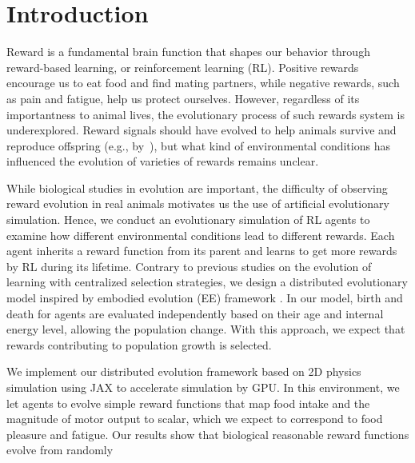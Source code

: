 \section{Introduction}\label{sec:intro}
Reward is a fundamental brain function that shapes our behavior through reward-based learning, or reinforcement learning (RL). Positive rewards encourage us to eat food and find mating partners, while negative rewards, such as pain and fatigue, help us protect ourselves. However, regardless of its importantness to animal lives, the evolutionary process of such rewards system is underexplored. Reward signals should have evolved to help animals survive and reproduce offspring (e.g., by~\cite{schultzNeuronalRewardDecision2015}), but what kind of environmental conditions has influenced the evolution of varieties of rewards remains unclear.

While biological studies in evolution are important, the difficulty of observing reward evolution in real animals motivates us the use of artificial evolutionary simulation. Hence, we conduct an evolutionary simulation of RL agents to examine how different environmental conditions lead to different rewards. Each agent inherits a reward function from its parent and learns to get more rewards by RL during its lifetime. Contrary to previous studies on the evolution of learning \citep{hintonHowLearningCan1987,singhWhereRewardsCome2009} with centralized selection strategies, we design a distributed evolutionary model inspired by embodied evolution (EE) framework \citep{watsonEmbodiedEvolutionDistributing2002,bredecheEmbodiedEvolutionCollective2018}. In our model, birth and death for agents are evaluated independently based on their age and internal energy level, allowing the population change. With this approach, we expect that rewards contributing to population growth is selected.

We implement our distributed evolution framework based on 2D physics simulation using JAX \citep{jax2018github} to accelerate simulation by GPU. In this environment, we let agents to evolve simple reward functions that map food intake and the magnitude of motor output to scalar, which we expect to correspond to food pleasure and fatigue. Our results show that biological reasonable reward functions evolve from randomly

